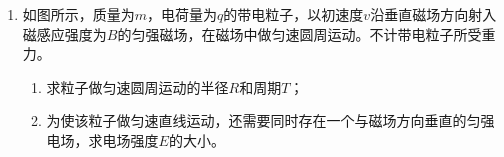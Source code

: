 \begin{enumerate}[leftmargin=0em]
{\begin{enumerate}
\end{enumerate}
}




\newpage
\item
{}
如图所示，质量为$ m $，电荷量为$ q $的带电粒子，以初速度$ v $沿垂直磁场方向射入磁感应强度为$ B $的匀强磁场，在磁场中做匀速圆周运动。不计带电粒子所受重力。
\begin{enumerate}
\renewcommand{\labelenumi}{\arabic{enumi}.}
\item
求粒子做匀速圆周运动的半径$ R $和周期$ T $；
\item 
为使该粒子做匀速直线运动，还需要同时存在一个与磁场方向垂直的匀强电场，求电场强度$ E $的大小。


\end{enumerate}

\begin{figure}[h!]
\flushright

\end{figure}









\end{enumerate}
